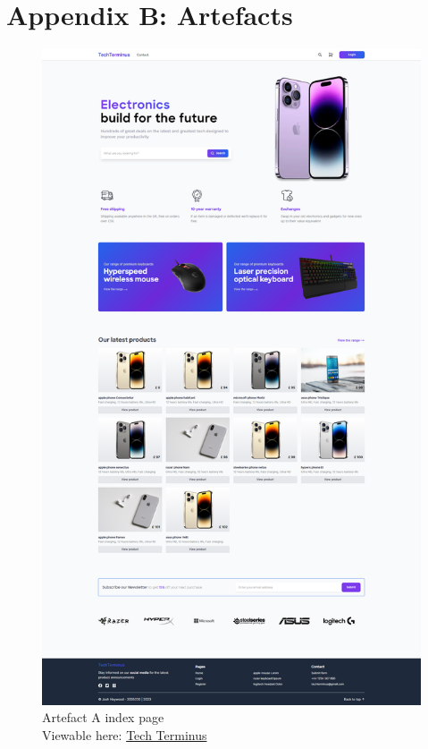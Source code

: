 \documentclass[article]{IEEEtran}
\begin{document}
        \section*{Appendix B: Artefacts}
            \begin{figure}[H]
                \caption{Artefact A index page \\\hspace{\textwidth} Viewable here: \href{http://www.tech-terminus.me/}{Tech Terminus}}
                \includegraphics[width=\columnwidth]{images/artefact/artefact-a-fullpage.png}
            \end{figure}
        
\end{document}
